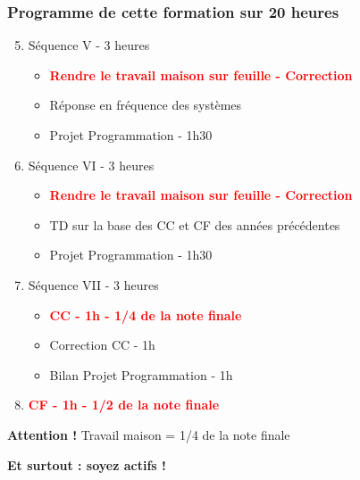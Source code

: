 \documentclass[a4paper,11pt]{beamer}
\begin{document}
\begin{frame}[plain]
\frametitle{Programme de cette formation sur 20 heures}
\begin{enumerate}
  \setcounter{enumi}{4}
  \item Séquence V - 3 heures 
  \begin{itemize}
    \item \textcolor{red}{\textbf{Rendre le travail maison sur feuille -
    Correction}}
    \item Réponse en fréquence des systèmes
    \item Projet Programmation - 1h30
  \end{itemize}
  \item Séquence VI - 3 heures
  \begin{itemize}
    \item \textcolor{red}{\textbf{Rendre le travail maison sur feuille -
    Correction}}
    \item TD sur la base des CC et CF des années précédentes
    \item Projet Programmation - 1h30
  \end{itemize}
   \item Séquence VII - 3 heures
  \begin{itemize}
    \item \textcolor{red}{\textbf{CC - 1h - 1/4 de la note finale}}
    \item Correction CC - 1h 
    \item Bilan Projet Programmation - 1h
  \end{itemize}
   \item \textcolor{red}{\textbf{CF - 1h - 1/2 de la note finale}}
\end{enumerate}
\pause
\begin{alertblock}{\textbf{Attention !} Travail maison = 1/4 de la note finale}
\end{alertblock}
\pause
\begin{alertblock}{\textbf{Et surtout : soyez actifs !}}
\end{alertblock}
\end{frame}
\end{document}
